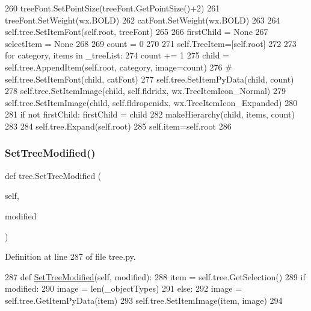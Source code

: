 \begin{DoxyCode}
260             treeFont.SetPointSize(treeFont.GetPointSize()+2)
261             treeFont.SetWeight(wx.BOLD)
262             catFont.SetWeight(wx.BOLD)
263 
264         self.tree.SetItemFont(self.root, treeFont)
265 
266         firstChild = \textcolor{keywordtype}{None}
267         selectItem = \textcolor{keywordtype}{None}
268 
269         count = 0
270 
271         self.TreeItem=[self.root]
272 
273         \textcolor{keywordflow}{for} category, items \textcolor{keywordflow}{in} \_treeList:
274             count += 1
275             child = self.tree.AppendItem(self.root, category, image=count)
276 \textcolor{comment}{#            self.tree.SetItemFont(child, catFont)}
277             self.tree.SetItemPyData(child, count)
278             self.tree.SetItemImage(child, self.fldridx, wx.TreeItemIcon\_Normal)
279             self.tree.SetItemImage(child, self.fldropenidx, wx.TreeItemIcon\_Expanded)
280             
281             \textcolor{keywordflow}{if} \textcolor{keywordflow}{not} firstChild: firstChild = child
282             makeHierarchy(child, items, count)
283 
284         self.tree.Expand(self.root)
285         self.item=self.root
286 
\end{DoxyCode}
\mbox{\label{namespacetree_ac7cd7dfad49d81ece04754d4b9c861c6}} 
\subsubsection{\texorpdfstring{Set\+Tree\+Modified()}{SetTreeModified()}}
{\footnotesize\ttfamily def tree.\+Set\+Tree\+Modified (\begin{DoxyParamCaption}\item[{}]{self,  }\item[{}]{modified }\end{DoxyParamCaption})}



Definition at line 287 of file tree.\+py.


\begin{DoxyCode}
287     \textcolor{keyword}{def }\hyperlink{namespacetree_ac7cd7dfad49d81ece04754d4b9c861c6}{SetTreeModified}(self, modified):
288         item = self.tree.GetSelection()
289         \textcolor{keywordflow}{if} modified:
290             image = len(\_objectTypes)
291         \textcolor{keywordflow}{else}:
292             image = self.tree.GetItemPyData(item)
293         self.tree.SetItemImage(item, image)
294 
\end{DoxyCode}


